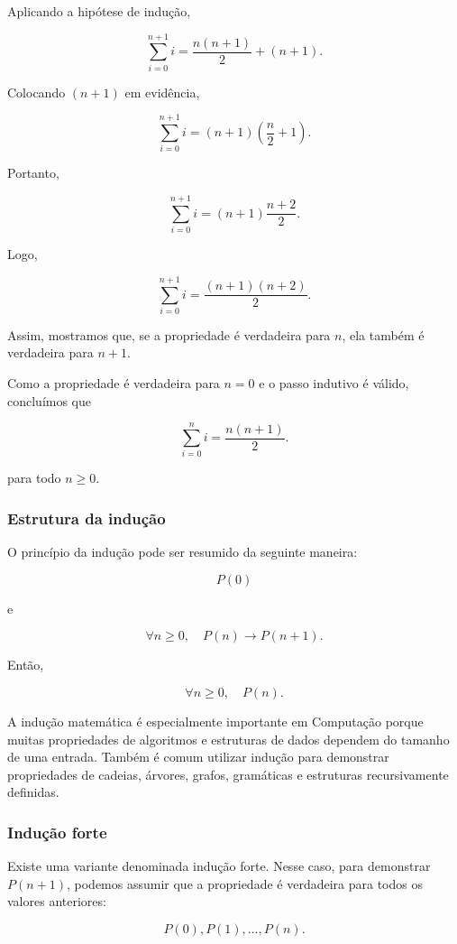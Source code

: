 \documentclass[
  brazilian,
  letterpaper,
]{book}
\theoremstyle{plain}
\theoremstyle{definition}
\theoremstyle{remark}
\begin{document}
Aplicando a hipótese de indução,

\[
\sum_{i = 0}^{n + 1} i = 
\frac{n(n+1)}{2}+(n+1).
\]

Colocando \((n+1)\) em evidência,

\[
\sum_{i = 0}^{n + 1} i = 
(n+1)
\left(
\frac n2+1
\right).
\]

Portanto,

\[
\sum_{i = 0}^{n + 1} i = 
(n+1)
\frac{n+2}{2}.
\]

Logo,

\[
\sum_{i = 0}^{n + 1} i = 
\frac{(n+1)(n+2)}{2}.
\]

Assim, mostramos que, se a propriedade é verdadeira para \(n\), ela
também é verdadeira para \(n+1\).

Como a propriedade é verdadeira para \(n=0\) e o passo indutivo é
válido, concluímos que

\[
\sum_{i = 0}^n i = 
\frac{n(n+1)}{2}.
\]

para todo \(n\geq0\).

\subsubsection{Estrutura da indução}\label{estrutura-da-induuxe7uxe3o}

O princípio da indução pode ser resumido da seguinte maneira:

\[
P(0)
\]

e

\[
\forall n\geq0,\quad
P(n)\rightarrow P(n+1).
\]

Então,

\[
\forall n\geq0,\quad P(n).
\]

A indução matemática é especialmente importante em Computação porque
muitas propriedades de algoritmos e estruturas de dados dependem do
tamanho de uma entrada. Também é comum utilizar indução para demonstrar
propriedades de cadeias, árvores, grafos, gramáticas e estruturas
recursivamente definidas.

\subsubsection{Indução forte}\label{induuxe7uxe3o-forte}

Existe uma variante denominada indução forte. Nesse caso, para
demonstrar \(P(n+1)\), podemos assumir que a propriedade é verdadeira
para todos os valores anteriores:

\[
P(0),P(1),\ldots,P(n).
\]
\end{document}
